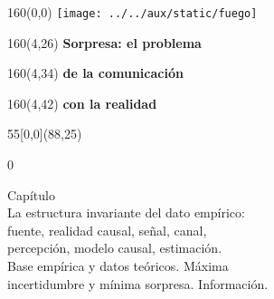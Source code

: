 \documentclass[shownotes,aspectratio=169]{beamer}
\newcounter{capitulo}
\newcommand{\unidad}{\thecapitulo \stepcounter{capitulo}}
\begin{document}
\begin{frame}

\begin{textblock}{160}(0,0)
\texttt{[image: ../../aux/static/fuego]}
\end{textblock}

\begin{textblock}{160}(4,26)
\LARGE \textcolor{black!5}{\fontsize{22}{0}\selectfont \textbf{Sorpresa: el problema}}
\end{textblock}
\begin{textblock}{160}(4,34)
\LARGE \textcolor{black!5}{\fontsize{22}{0}\selectfont \textbf{de la comunicación}}
\end{textblock}
\begin{textblock}{160}(4,42)
\LARGE \textcolor{black!5}{\fontsize{22}{0}\selectfont \textbf{con la realidad}}
\end{textblock}



\begin{textblock}{55}[0,0](88,25)
\begin{turn}{0}
\parbox{7cm}{\sloppy\setlength\parfillskip{0pt}
\textcolor{black!0}{Capítulo \unidad} \\
\small\textcolor{black!5}{\hspace{0.05cm}La estructura invariante del dato empírico:} \\
\small\textcolor{black!5}{\hspace{0.1cm}fuente, realidad causal, señal, canal,} \\ \small\textcolor{black!5}{\hspace{0.05cm}percepción, modelo causal, estimación.} \\
\small\textcolor{black!5}{\hspace{-0.15cm}Base empírica y datos teóricos. Máxima} \\
\small\textcolor{black!5}{\hspace{-0.35cm}incertidumbre y mínima sorpresa. Información.} \\
}
\end{turn}
\end{textblock}


\end{frame}
\end{document}
